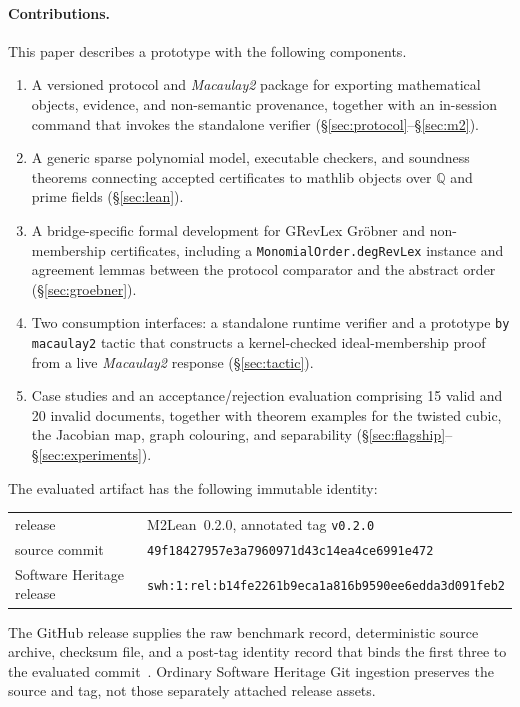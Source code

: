 \documentclass[11pt]{article}
\newcommand{\M}{\textit{Macaulay2}}
\newcommand{\mathlib}{\textsf{mathlib}}
\newcommand{\QQ}{\mathbb{Q}}
\newcommand{\code}[1]{\texttt{#1}}
\begin{document}
\paragraph{Contributions.}
This paper describes a prototype with the following components.

\begin{enumerate}
\item A versioned protocol and \M{} package for exporting mathematical
  objects, evidence, and non-semantic provenance, together with an
  in-session command that invokes the standalone verifier
  (\S\ref{sec:protocol}--\S\ref{sec:m2}).
\item A generic sparse polynomial model, executable checkers, and
  soundness theorems connecting accepted certificates to
  \mathlib{} objects over $\QQ$ and prime fields (\S\ref{sec:lean}).
\item A bridge-specific formal development for GRevLex Gr\"obner and
  non-membership certificates, including a
  \code{MonomialOrder.degRevLex} instance and agreement lemmas between
  the protocol comparator and the abstract order
  (\S\ref{sec:groebner}).
\item Two consumption interfaces: a standalone runtime verifier and a
  prototype \code{by macaulay2} tactic that constructs a kernel-checked
  ideal-membership proof from a live \M{} response
  (\S\ref{sec:tactic}).
\item Case studies and an acceptance/rejection evaluation comprising 15 valid
  and 20 invalid documents, together with theorem examples for the
  twisted cubic, the Jacobian map, graph colouring, and separability
  (\S\ref{sec:flagship}--\S\ref{sec:experiments}).
\end{enumerate}

\begin{samepage}
The evaluated artifact has the following immutable identity:
\begin{center}
\small
\begin{tabular}{@{}ll@{}}
release & M2Lean~0.2.0, annotated tag \code{v0.2.0} \\
source commit & \code{49f18427957e3a7960971d43c14ea4ce6991e472} \\
Software Heritage release & \code{swh:1:rel:b14fe2261b9eca1a816b9590ee6edda3d091feb2} \\
\end{tabular}
\end{center}
The GitHub release supplies the raw benchmark record, deterministic
source archive, checksum file, and a post-tag identity record that binds
the first three to the evaluated commit~\cite{m2lean-benchmark,m2lean-repo}.
Ordinary Software Heritage Git ingestion preserves the source and tag,
not those separately attached release assets.
\end{samepage}
\end{document}
